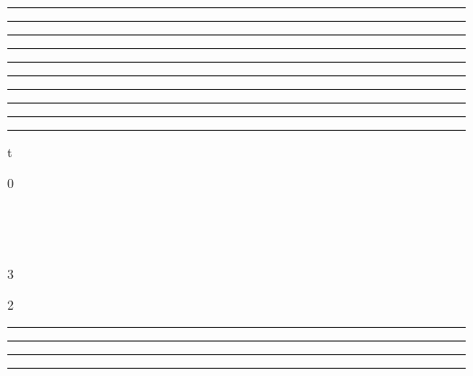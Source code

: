 \documentclass[]{article}
\begin{document}
\begin{center}\rule{3in}{0.4pt}\end{center}

\begin{center}\rule{3in}{0.4pt}\end{center}

\begin{center}\rule{3in}{0.4pt}\end{center}

\begin{center}\rule{3in}{0.4pt}\end{center}

\begin{center}\rule{3in}{0.4pt}\end{center}

\begin{center}\rule{3in}{0.4pt}\end{center}

\begin{center}\rule{3in}{0.4pt}\end{center}

\begin{center}\rule{3in}{0.4pt}\end{center}

\begin{center}\rule{3in}{0.4pt}\end{center}

\begin{center}\rule{3in}{0.4pt}\end{center}

t

0

 \pi~ 

\pi~

 3\pi~ 

2\pi~

\begin{center}\rule{3in}{0.4pt}\end{center}

\begin{center}\rule{3in}{0.4pt}\end{center}

\begin{center}\rule{3in}{0.4pt}\end{center}

\begin{center}\rule{3in}{0.4pt}\end{center}
\end{document}
